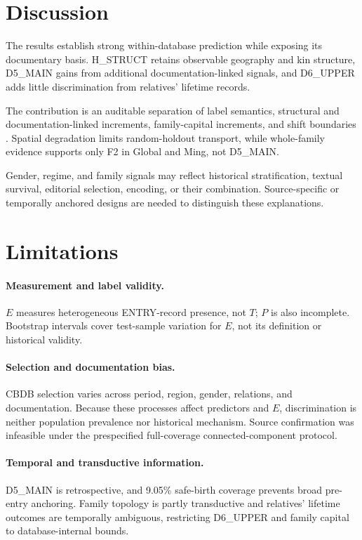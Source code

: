 \documentclass[sigconf]{acmart}
\begin{document}
\section{Discussion}
The results establish strong within-database prediction while exposing its documentary basis. H\_STRUCT retains observable geography and kin structure, D5\_MAIN gains from additional documentation-linked signals, and D6\_UPPER adds little discrimination from relatives' lifetime records.

The contribution is an auditable separation of label semantics, structural and documentation-linked increments, family-capital increments, and shift boundaries \cite{hand2018administrative,jacobs2021measurement}. Spatial degradation limits random-holdout transport, while whole-family evidence supports only F2 in Global and Ming, not D5\_MAIN.

Gender, regime, and family signals may reflect historical stratification, textual survival, editorial selection, encoding, or their combination. Source-specific or temporally anchored designs are needed to distinguish these explanations.

\section{Limitations}
\paragraph{Measurement and label validity.}
$E$ measures heterogeneous ENTRY-record presence, not $T$; $P$ is also incomplete. Bootstrap intervals cover test-sample variation for $E$, not its definition or historical validity.

\paragraph{Selection and documentation bias.}
CBDB selection varies across period, region, gender, relations, and documentation. Because these processes affect predictors and $E$, discrimination is neither population prevalence nor historical mechanism. Source confirmation was infeasible under the prespecified full-coverage connected-component protocol.

\paragraph{Temporal and transductive information.}
D5\_MAIN is retrospective, and 9.05\% safe-birth coverage prevents broad pre-entry anchoring. Family topology is partly transductive and relatives' lifetime outcomes are temporally ambiguous, restricting D6\_UPPER and family capital to database-internal bounds.
\end{document}
